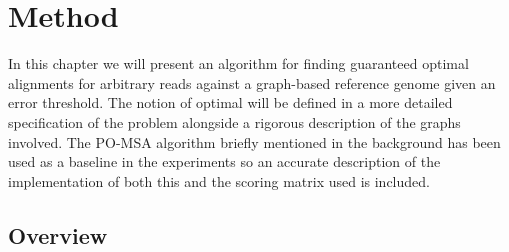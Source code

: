 \documentclass[thesis.tex]{subfiles}
\begin{document}
\chapter{Method}
In this chapter we will present an algorithm for finding guaranteed optimal alignments for arbitrary reads against a graph-based reference genome given an error threshold. The notion of optimal will be defined in a more detailed specification of the problem alongside a rigorous description of the graphs involved. The PO-MSA algorithm briefly mentioned in the background has been used as a baseline in the experiments so an accurate description of the implementation of both this and the scoring matrix used is included.
\section{Overview}
\end{document}

